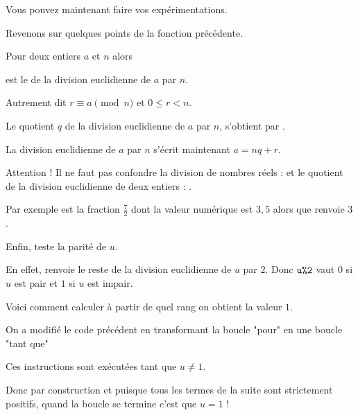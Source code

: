 Vous pouvez maintenant faire vos expérimentations.

\diapo


Revenons sur quelques points de la fonction précédente.

Pour deux entiers $a$ et $n$ alors

 est 
le  de la division euclidienne de $a$ par $n$.

\change

Autrement dit $r \equiv a \pmod{n}$ et $0 \le r < n$.


\change

Le quotient $q$ de la division euclidienne de $a$ par $n$, s'obtient par
 .

\change 
 La division euclidienne de $a$ par $n$ s'écrit maintenant
 $a=nq+r$.

\change
Attention !
Il ne faut pas confondre la division de nombres réels : 
et le quotient de la division euclidienne de deux entiers : .

\change
Par exemple  est la fraction $\frac72$ dont la valeur numérique est $3,5$
alors que  renvoie $3$. 


\change
Enfin,  teste la parité de $u$.

En effet,  renvoie le reste de la division euclidienne 
de $u$ par $2$. Donc $\texttt{u\%2}$ vaut $0$ si $u$ est pair 
et $1$ si $u$ est impair.


\diapo

Voici comment calculer à partir de quel rang on obtient la valeur $1$.

On a modifié le code précédent en transformant la boucle "pour" en une boucle "tant que"

Ces instructions sont exécutées tant que $u \neq 1$.

Donc par construction et puisque tous les termes de la suite sont strictement positifs, quand la boucle se termine c'est que $u=1$ !



